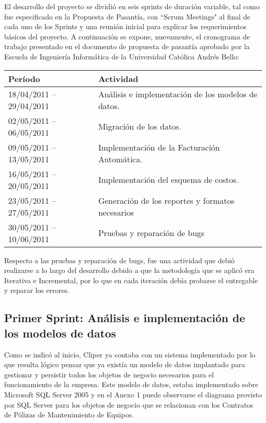 \documentclass[a4paper, 12pt]{article}
\begin{document}
El desarrollo del proyecto se dividió en seis sprints de duración variable, tal como fue especificado en la Propuesta de Pasantía, con ``Scrum Meetings" al final de cada uno de los Sprints y una reunión inicial para explicar los requerimientos básicos del proyecto. A continuación se expone, nuevamente, el cronograma de trabajo presentado en el documento de propuesta de pasantía aprobado por la Escuela de Ingeniería Informática de la Universidad Católica Andrés Bello:

\begin{center}
    \begin{tabular}{ | p{5cm} | p{9cm} | }
        \hline
        \textbf{Período} & \textbf{Actividad} \\ \hline
        18/04/2011 – 29/04/2011 & Análisis e implementación de los modelos de datos. \\ \hline
        02/05/2011 – 06/05/2011 & Migración de los datos. \\ \hline
        09/05/2011 – 13/05/2011 & Implementación de la Facturación Automática. \\ \hline
        16/05/2011 – 20/05/2011 & Implementación del esquema de costos. \\ \hline
        23/05/2011 – 27/05/2011 & Generación de los reportes y formatos necesarios \\ \hline
        30/05/2011 – 10/06/2011 & Pruebas y reparación de bugs \\ \hline
    \end{tabular}
\end{center}

Respecto a las pruebas y reparación de bugs, fue una actividad que debió realizarse a lo largo del desarrollo debido a que la metodología que se aplicó era Iterativa e Incremental, por lo que en cada iteración debía probarse el entregable y reparar los errores.

\subsection{Primer Sprint: Análisis e implementación de los modelos de datos}
Como se indicó al inicio, Cliper ya contaba con un sistema implementado por lo que resulta lógico pensar que ya existía un modelo de datos implantado para gestionar y persistir todos los objetos de negocio necesarios para el funcionamiento de la empresa. Este modelo de datos, estaba implementado sobre Microsoft SQL Server 2005 y en el Anexo 1 puede observarse el diagrama provisto por SQL Server para los objetos de negocio que se relacionan con los Contratos de Pólizas de Mantenimiento de Equipos.
\end{document}
